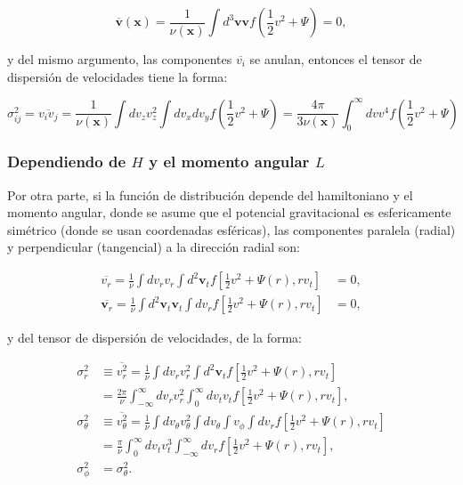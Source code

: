 \begin{equation}
\overline{\textbf{v}}(\textbf{x}) = \frac{1}{\nu(\textbf{x})} \int d^3 \textbf{v} \textbf{v} f \left ( \frac{1}{2}v^2  + \Psi \right ) = 0,
\end{equation}

y del mismo argumento, las componentes $\overline{v_i}$ se anulan, entonces el tensor de dispersión de velocidades tiene la forma:

\begin{equation}
\sigma_{ij}^2 = \overline{v_i v_j} = \frac{1}{\nu(\textbf{x})} \int d v_z  v_z^2 \int d v_x d v_y f \left ( \frac{1}{2} v^2  + \Psi \right ) = \frac{4 \pi}{3 \nu(\textbf{x})}   \int_0^{\infty} d v  v^4  f \left ( \frac{1}{2} v^2  + \Psi \right )
\end{equation}



\subsubsection{Dependiendo de $H$ y el momento angular $L$}

Por otra parte, si la función de distribución depende del hamiltoniano y el momento angular, donde se asume que el potencial gravitacional es esfericamente simétrico (donde se usan coordenadas esféricas), las componentes paralela (radial) y perpendicular (tangencial) a la dirección radial son:

\begin{align}
\overline{v_r} = \frac{1}{\nu} \int d v_r v_r \int d^2 \textbf{v}_t f \left [ \frac{1}{2}v^2  + \Psi (r) , r v_t \right ] &= 0, \\
\overline{\textbf{v}_r} = \frac{1}{\nu} \int d^2 \textbf{v}_t \textbf{v}_t \int d v_r f \left [ \frac{1}{2}v^2  + \Psi (r) , r v_t \right ] &= 0,
\end{align}

y del tensor de dispersión de velocidades, de la forma:

\begin{equation}
\begin{aligned}
\sigma_r^2 &\equiv \overline{v_r^2} = \frac{1}{\nu} \int d v_r v_r^2 \int d^2 \textbf{v}_t  f \left [ \frac{1}{2}v^2  + \Psi (r) , r v_t \right ] \\
& = \frac{2\pi }{\nu} \int_{-\infty}^{\infty} dv_r v_r^2 \int_0^\infty d v_t v_t  f \left [ \frac{1}{2}v^2  + \Psi (r) , r v_t \right ], \\
\sigma_{\theta}^2 &\equiv \overline{v_{\theta}^2} = \frac{1}{\nu} \int d v_\theta v_\theta^2 \int d v_\theta \int v_\phi \int d v_r  f \left [ \frac{1}{2}v^2  + \Psi (r) , r v_t \right ] \\
& = \frac{\pi }{\nu} \int_{0}^{\infty} dv_t v_t^3 \int_{-\infty}^\infty d v_r  f \left [ \frac{1}{2}v^2  + \Psi (r) , r v_t \right ], \\
\sigma_{\phi}^2 & = \sigma_{\theta}^2.
\end{aligned}
\end{equation}

